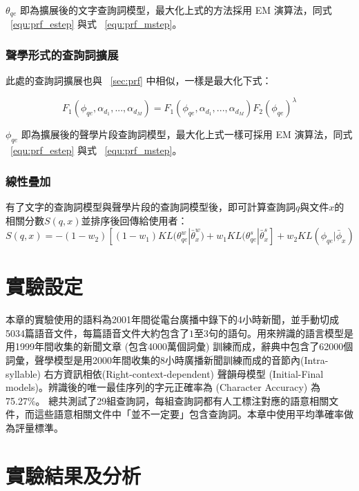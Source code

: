 $\theta_{qe}$ 即為擴展後的文字查詢詞模型，最大化上式的方法採用 EM 演算法，同式 ~\ref{equ:prf_estep} 與式 ~\ref{equ:prf_mstep}。

\subsubsection{聲學形式的查詢詞擴展}
此處的查詢詞擴展也與 ~\ref{sec:prf} 中相似，一樣是最大化下式：

\begin{equation}
\label{equ:prf_f1f2_acoustic}
F_1(\phi_{qe}, \alpha_{d_1}, ..., \alpha_{d_M}) = F_1(\phi_{qe}, \alpha_{d_1}, ..., \alpha_{d_M}) F_2(\phi_{qe})^\lambda
\end{equation}

$\phi_{qe}$ 即為擴展後的聲學片段查詢詞模型，最大化上式一樣可採用 EM 演算法，同式 ~\ref{equ:prf_estep} 與式 ~\ref{equ:prf_mstep}。

\subsubsection{線性疊加}
有了文字的查詢詞模型與聲學片段的查詢詞模型後，即可計算查詢詞$q$與文件$x$的相關分數$S(q, x)$並排序後回傳給使用者：
\begin{equation}
\label{equ:prf_interpolation}
S(q, x) = -{(1-w_2)[(1-w_1)KL(\theta_{qe}^{w}|\bar{\theta}_x^{w}) + w_1KL(\theta_{qe}^{s}|\bar{\theta}_x^{s}] + w_2KL(\phi_{qe}|\bar{\phi}_x)}
\end{equation}


\section{實驗設定}
\label{sec:chap3_exp_design} 
本章的實驗使用的語料為2001年間從電台廣播中錄下的4小時新聞，並手動切成5034篇語音文件，每篇語音文件大約包含了$1至3$句的語句。用來辨識的語言模型是用1999年間收集的新聞文章 (包含4000萬個詞彙) 訓練而成，辭典中包含了62000個詞彙，聲學模型是用2000年間收集的8小時廣播新聞訓練而成的音節內(Intra-syllable) 右方資訊相依(Right-context-dependent) 聲韻母模型 (Initial-Final models)。辨識後的唯一最佳序列的字元正確率為 (Character Accuracy) 為75.27\%。
總共測試了29組查詢詞，每組查詢詞都有人工標注對應的語意相關文件，而這些語意相關文件中「並不一定要」包含查詢詞。本章中使用平均準確率做為評量標準。

\section{實驗結果及分析}

